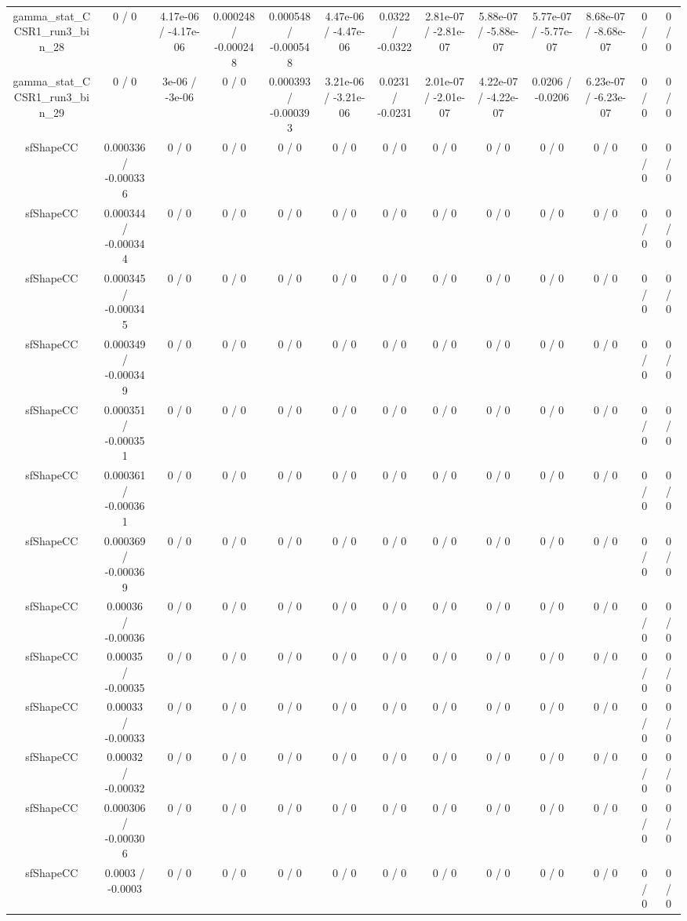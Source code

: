 \documentclass[10pt]{article}
\begin{document}
\begin{table}[htbp]
\begin{center}
\begin{tabular}{|c|c|c|c|c|c|c|c|c|c|c|c|c|}
  gamma_stat_CCSR1_run3_bin_28 & 0 / 0 & 4.17e-06 / -4.17e-06 & 0.000248 / -0.000248 & 0.000548 / -0.000548 & 4.47e-06 / -4.47e-06 & 0.0322 / -0.0322 & 2.81e-07 / -2.81e-07 & 5.88e-07 / -5.88e-07 & 5.77e-07 / -5.77e-07 & 8.68e-07 / -8.68e-07 & 0 / 0 & 0 / 0 \\ 
  gamma_stat_CCSR1_run3_bin_29 & 0 / 0 & 3e-06 / -3e-06 & 0 / 0 & 0.000393 / -0.000393 & 3.21e-06 / -3.21e-06 & 0.0231 / -0.0231 & 2.01e-07 / -2.01e-07 & 4.22e-07 / -4.22e-07 & 0.0206 / -0.0206 & 6.23e-07 / -6.23e-07 & 0 / 0 & 0 / 0 \\ 
  sfShapeCC & 0.000336 / -0.000336 & 0 / 0 & 0 / 0 & 0 / 0 & 0 / 0 & 0 / 0 & 0 / 0 & 0 / 0 & 0 / 0 & 0 / 0 & 0 / 0 & 0 / 0 \\ 
  sfShapeCC & 0.000344 / -0.000344 & 0 / 0 & 0 / 0 & 0 / 0 & 0 / 0 & 0 / 0 & 0 / 0 & 0 / 0 & 0 / 0 & 0 / 0 & 0 / 0 & 0 / 0 \\ 
  sfShapeCC & 0.000345 / -0.000345 & 0 / 0 & 0 / 0 & 0 / 0 & 0 / 0 & 0 / 0 & 0 / 0 & 0 / 0 & 0 / 0 & 0 / 0 & 0 / 0 & 0 / 0 \\ 
  sfShapeCC & 0.000349 / -0.000349 & 0 / 0 & 0 / 0 & 0 / 0 & 0 / 0 & 0 / 0 & 0 / 0 & 0 / 0 & 0 / 0 & 0 / 0 & 0 / 0 & 0 / 0 \\ 
  sfShapeCC & 0.000351 / -0.000351 & 0 / 0 & 0 / 0 & 0 / 0 & 0 / 0 & 0 / 0 & 0 / 0 & 0 / 0 & 0 / 0 & 0 / 0 & 0 / 0 & 0 / 0 \\ 
  sfShapeCC & 0.000361 / -0.000361 & 0 / 0 & 0 / 0 & 0 / 0 & 0 / 0 & 0 / 0 & 0 / 0 & 0 / 0 & 0 / 0 & 0 / 0 & 0 / 0 & 0 / 0 \\ 
  sfShapeCC & 0.000369 / -0.000369 & 0 / 0 & 0 / 0 & 0 / 0 & 0 / 0 & 0 / 0 & 0 / 0 & 0 / 0 & 0 / 0 & 0 / 0 & 0 / 0 & 0 / 0 \\ 
  sfShapeCC & 0.00036 / -0.00036 & 0 / 0 & 0 / 0 & 0 / 0 & 0 / 0 & 0 / 0 & 0 / 0 & 0 / 0 & 0 / 0 & 0 / 0 & 0 / 0 & 0 / 0 \\ 
  sfShapeCC & 0.00035 / -0.00035 & 0 / 0 & 0 / 0 & 0 / 0 & 0 / 0 & 0 / 0 & 0 / 0 & 0 / 0 & 0 / 0 & 0 / 0 & 0 / 0 & 0 / 0 \\ 
  sfShapeCC & 0.00033 / -0.00033 & 0 / 0 & 0 / 0 & 0 / 0 & 0 / 0 & 0 / 0 & 0 / 0 & 0 / 0 & 0 / 0 & 0 / 0 & 0 / 0 & 0 / 0 \\ 
  sfShapeCC & 0.00032 / -0.00032 & 0 / 0 & 0 / 0 & 0 / 0 & 0 / 0 & 0 / 0 & 0 / 0 & 0 / 0 & 0 / 0 & 0 / 0 & 0 / 0 & 0 / 0 \\ 
  sfShapeCC & 0.000306 / -0.000306 & 0 / 0 & 0 / 0 & 0 / 0 & 0 / 0 & 0 / 0 & 0 / 0 & 0 / 0 & 0 / 0 & 0 / 0 & 0 / 0 & 0 / 0 \\ 
  sfShapeCC & 0.0003 / -0.0003 & 0 / 0 & 0 / 0 & 0 / 0 & 0 / 0 & 0 / 0 & 0 / 0 & 0 / 0 & 0 / 0 & 0 / 0 & 0 / 0 & 0 / 0 \\ 

\end{tabular}
\end{center}
\end{table}
\end{document}
